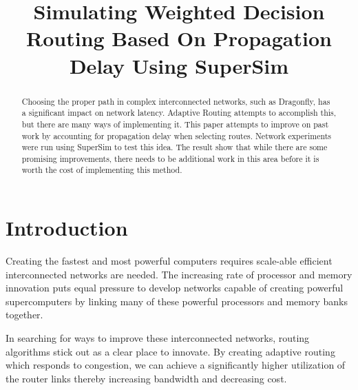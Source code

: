\documentclass[conference,12pt]{IEEEtran}
\begin{document}
\twocolumn
\title{Simulating Weighted Decision Routing Based On Propagation Delay Using SuperSim
}

\author{
\and
{}
}
\vspace{3 in}
\maketitle



\begin{abstract}
Choosing the proper path in complex interconnected networks, such as Dragonfly, has a significant impact on network latency. Adaptive Routing attempts to accomplish this, but there are many ways of implementing it. This paper attempts to improve on past work by accounting for propagation delay when selecting routes. Network experiments were run using SuperSim to test this idea. The result show that while there are some promising improvements, there needs to be additional work in this area before it is worth the cost of implementing this method.

\end{abstract}


\section{Introduction}
Creating the fastest and most powerful computers requires scale-able efficient interconnected networks are needed. The increasing rate of processor and memory innovation puts equal pressure to develop networks capable of creating powerful supercomputers by linking many of these powerful processors and memory banks together. 

In searching for ways to improve these interconnected networks, routing algorithms stick out as a clear place to innovate. By creating adaptive routing which responds to congestion, we can achieve a significantly higher utilization of the router links thereby increasing bandwidth and decreasing cost.
\end{document}
